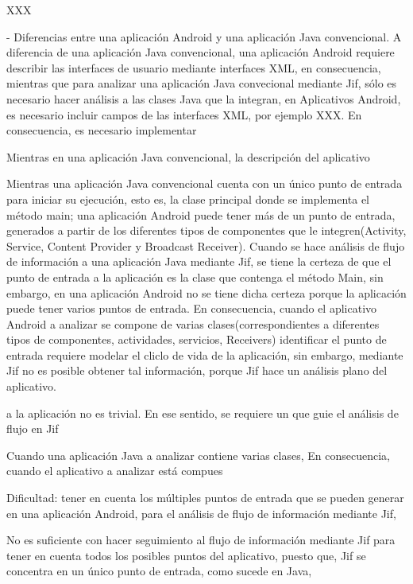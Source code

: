 XXX\newline






- Diferencias entre una aplicación Android y una aplicación Java convencional. 
A diferencia de una aplicación Java convencional, una aplicación Android
requiere describir las interfaces de usuario mediante interfaces XML, en
consecuencia, mientras que para analizar una aplicación Java convecional
mediante Jif, sólo es necesario hacer análisis  a las clases Java que la
integran, en Aplicativos Android, es necesario incluir campos de las interfaces
XML, por ejemplo XXX. En consecuencia, es necesario implementar 



Mientras en una aplicación Java convencional, la descripción del aplicativo 


Mientras una aplicación Java convencional cuenta con un único punto de entrada
para iniciar su ejecución, esto es, la clase principal donde se implementa el
método main; una aplicación Android puede tener más de un punto de entrada,
generados a partir de los diferentes tipos de componentes que le
integren(Activity, Service, Content Provider y Broadcast Receiver).
Cuando se hace análisis de flujo de información a una aplicación Java mediante
Jif, se tiene la certeza de que el punto de entrada a la aplicación es la clase
que contenga el método Main, sin embargo, en una aplicación Android no se tiene
dicha certeza porque la aplicación puede tener varios puntos de entrada. En
consecuencia, cuando el aplicativo Android a analizar se compone de varias
clases(correspondientes a diferentes tipos de componentes, actividades,
servicios, Receivers) identificar el punto de entrada requiere modelar el cliclo
de vida de la aplicación, sin embargo, mediante Jif no es posible obtener tal
información, porque Jif hace un análisis plano del aplicativo.

a la aplicación no es
trivial. En ese sentido, se requiere un 
que guie el análisis de flujo en Jif


Cuando una aplicación Java a analizar contiene varias clases, 
En consecuencia, cuando el aplicativo a analizar está compues

Dificultad: 
tener en cuenta los múltiples puntos de entrada que se pueden generar en una
aplicación Android, para el análisis de flujo de información mediante Jif, 

No es suficiente con hacer seguimiento al flujo de información mediante Jif para
tener en cuenta todos los posibles puntos del aplicativo, puesto que, Jif se
concentra en un único punto de entrada, como sucede en Java, 


